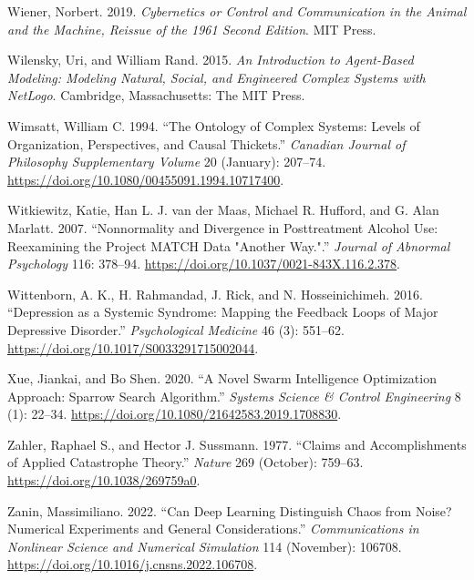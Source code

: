 \documentclass[
  a4paper,
  DIV=11,
  numbers=noendperiod,
  oneside]{scrreprt}
\newlength{\cslhangindent}
\newenvironment{CSLReferences}[2] %
 {\begin{list}{}{%
  \setlength{\itemindent}{0pt}
  \setlength{\leftmargin}{0pt}
  \setlength{\parsep}{0pt}
  \ifodd #1
   \setlength{\leftmargin}{\cslhangindent}
   \setlength{\itemindent}{-1\cslhangindent}
  \fi
  \setlength{\itemsep}{#2\baselineskip}}}
 {\end{list}}
\begin{document}
\begin{CSLReferences}{1}{0}
Wiener, Norbert. 2019. \emph{Cybernetics or {Control} and
{Communication} in the {Animal} and the {Machine}, {Reissue} of the 1961
Second Edition}. {MIT Press}.

Wilensky, Uri, and William Rand. 2015. \emph{An Introduction to
Agent-Based Modeling: Modeling Natural, Social, and Engineered Complex
Systems with {NetLogo}}. {Cambridge, Massachusetts}: {The MIT Press}.

Wimsatt, William C. 1994. {``The Ontology of Complex Systems: Levels of
Organization, Perspectives, and Causal Thickets.''} \emph{Canadian
Journal of Philosophy Supplementary Volume} 20 (January): 207--74.
\url{https://doi.org/10.1080/00455091.1994.10717400}.

Witkiewitz, Katie, Han L. J. van der Maas, Michael R. Hufford, and G.
Alan Marlatt. 2007. {``Nonnormality and Divergence in Posttreatment
Alcohol Use: {Reexamining} the {Project MATCH} Data "Another Way.".''}
\emph{Journal of Abnormal Psychology} 116: 378--94.
\url{https://doi.org/10.1037/0021-843X.116.2.378}.

Wittenborn, A. K., H. Rahmandad, J. Rick, and N. Hosseinichimeh. 2016.
{``Depression as a Systemic Syndrome: Mapping the Feedback Loops of
Major Depressive Disorder.''} \emph{Psychological Medicine} 46 (3):
551--62. \url{https://doi.org/10.1017/S0033291715002044}.

Xue, Jiankai, and Bo Shen. 2020. {``A Novel Swarm Intelligence
Optimization Approach: Sparrow Search Algorithm.''} \emph{Systems
Science \& Control Engineering} 8 (1): 22--34.
\url{https://doi.org/10.1080/21642583.2019.1708830}.

Zahler, Raphael S., and Hector J. Sussmann. 1977. {``Claims and
Accomplishments of Applied Catastrophe Theory.''} \emph{Nature} 269
(October): 759--63. \url{https://doi.org/10.1038/269759a0}.

Zanin, Massimiliano. 2022. {``Can Deep Learning Distinguish Chaos from
Noise? Numerical Experiments and General Considerations.''}
\emph{Communications in Nonlinear Science and Numerical Simulation} 114
(November): 106708. \url{https://doi.org/10.1016/j.cnsns.2022.106708}.


\end{CSLReferences}
\end{document}
